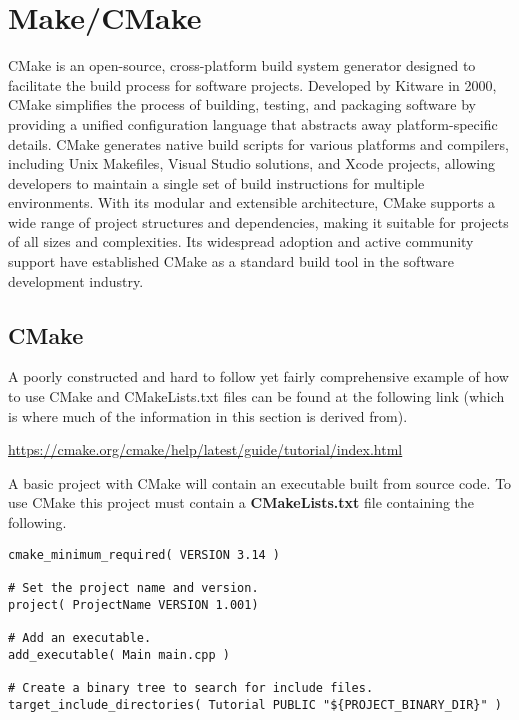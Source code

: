 \chapter{Make/CMake}
\thispagestyle{fancy}
\lstset{}\lstset{language=make, style=makestyle}

CMake is an open-source, cross-platform build system generator designed to facilitate the build process for software projects. Developed by Kitware in 2000, CMake simplifies the process of building, testing, and packaging software by providing a unified configuration language that abstracts away platform-specific details. CMake generates native build scripts for various platforms and compilers, including Unix Makefiles, Visual Studio solutions, and Xcode projects, allowing developers to maintain a single set of build instructions for multiple environments. With its modular and extensible architecture, CMake supports a wide range of project structures and dependencies, making it suitable for projects of all sizes and complexities. Its widespread adoption and active community support have established CMake as a standard build tool in the software development industry.

\section{CMake}

A poorly constructed and hard to follow yet fairly comprehensive example of how to use CMake and CMakeLists.txt files can be found at the following link (which is where much of the information in this section is derived from).
\begin{urlbox}
\url{https://cmake.org/cmake/help/latest/guide/tutorial/index.html}
\end{urlbox}

A basic project with CMake will contain an executable built from source code. To use CMake this project must contain a \textbf{CMakeLists.txt} file containing the following.
\begin{lstlisting}
cmake_minimum_required( VERSION 3.14 )

# Set the project name and version.
project( ProjectName VERSION 1.001)

# Add an executable.
add_executable( Main main.cpp )

# Create a binary tree to search for include files.
target_include_directories( Tutorial PUBLIC "${PROJECT_BINARY_DIR}" )
\end{lstlisting}

